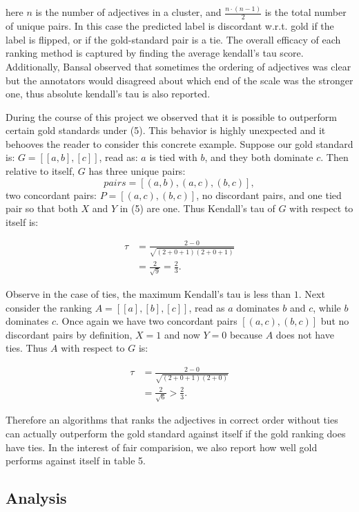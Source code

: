 \documentclass[11pt,letterpaper]{article}
\begin{document}
here $n$ is the number of adjectives in a cluster, and $\frac{n \cdot (n-1)}{2}$ is the total number of unique pairs. In this case the predicted label is discordant w.r.t. gold if the label is flipped, or if the gold-standard pair is a tie. The overall efficacy of each ranking method is captured by finding the average kendall's tau score. Additionally, Bansal observed that sometimes the ordering of adjectives was clear but the annotators would disagreed about which end of the scale was the stronger one, thus absolute kendall's tau is also reported.

During the course of this project we observed that it is possible to outperform certain gold standards under (5). This behavior is highly unexpected and it behooves the reader to consider this concrete example. Suppose our gold standard is: $G = [[a,b],[c]]$, read as: $a$ is tied with $b$, and they both dominate $c$. Then relative to itself, $G$ has three unique pairs:
\[
	pairs = [(a,b),(a,c),(b,c)],
\]
two concordant pairs: $P = [(a,c),(b,c)]$, no discordant pairs, and one tied pair so that both $X$ and $Y$ in (5) are one. Thus Kendall's tau of $G$ with respect to itself is:

\begin{align*}
	\tau &= \frac{2 - 0}{\sqrt{(2 + 0 + 1)(2 + 0 + 1)}} \\
		 &= \frac{2}{\sqrt{9}} = \frac{2}{3}.
\end{align*}

Observe in the case of ties, the maximum Kendall's tau is less than $1$. Next consider the ranking $A = [[a],[b],[c]]$, read as $a$ dominates $b$ and $c$, while $b$ dominates $c$. Once again we have two concordant pairs $[(a,c),(b,c)]$ but no discordant pairs by definition, $X = 1$ and now $Y = 0$ because $A$ does not have ties. Thus $A$ with respect to $G$ is:

\begin{align*}
	\tau &= \frac{2 - 0}{\sqrt{(2 + 0 + 1)(2 + 0)}} \\
		 &= \frac{2}{\sqrt{6}} > \frac{2}{3}.
\end{align*}

Therefore an algorithms that ranks the adjectives in correct order without ties can actually outperform the gold standard against itself if the gold ranking does have ties. In the interest of fair comparision, we also report how well gold performs against itself in table 5.

\subsection{Analysis}
\end{document}
